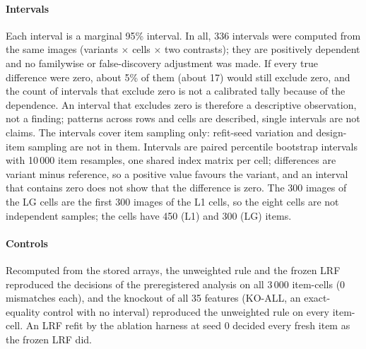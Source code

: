 \documentclass[journal,onecolumn]{IEEEtran}
\theoremstyle{plain}
\begin{document}
\paragraph*{Intervals}
Each interval is a marginal 95\% interval. In all, 336 intervals were computed from the same images (variants $\times$ cells $\times$ two
contrasts); they are positively dependent and no familywise or false-discovery adjustment was made. If every true difference were zero,
about 5\% of them (about 17) would still exclude zero, and the count of intervals that exclude zero is not a calibrated tally because of
the dependence. An interval that excludes zero is therefore a descriptive observation, not a finding; patterns across rows and cells are
described, single intervals are not claims. The intervals cover item sampling only: refit-seed variation and design-item sampling are not
in them.
Intervals are paired percentile bootstrap intervals with 10\,000 item resamples, one shared index matrix per cell; differences are
variant minus reference, so a positive value favours the variant, and an interval that contains zero does not show that the difference is
zero.
The 300 images of the LG cells are the first 300 images of the L1 cells, so the eight cells are not independent samples; the cells have
450 (L1) and 300 (LG) items.

\paragraph*{Controls}
Recomputed from the stored arrays, the unweighted rule and the frozen LRF reproduced the decisions of the preregistered analysis on all
3\,000 item-cells (0 mismatches each), and the knockout of all 35 features (KO-ALL, an exact-equality control with no interval)
reproduced the unweighted rule on every item-cell.
An LRF refit by the ablation harness at seed 0 decided every fresh item as the frozen LRF did.
\end{document}
